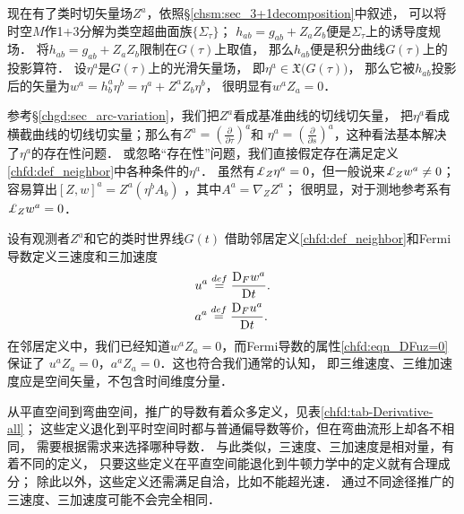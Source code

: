 现在有了类时切矢量场$Z^a$，依照\S\ref{chsm:sec_3+1decomposition}中叙述，
可以将时空$M$作1+3分解为类空超曲面族$\{\Sigma_{\tau}\}$；
$h_{ab}=g_{ab}+ Z_a Z_b$便是$\Sigma_{\tau}$上的诱导度规场．
将$h_{ab}=g_{ab}+ Z_a Z_b$限制在$G(\tau)$上取值，
那么$h_{ab}$便是积分曲线$G(\tau)$上的投影算符．
设$\eta^a$是$G(\tau)$上的光滑矢量场，
即$\eta^a \in \mathfrak{X}\bigl(G(\tau)\bigr)$，
那么它被$h_{ab}$投影后的矢量为$w^a=h^a_b \eta^b = \eta^a+Z^a Z_b \eta^b$，
很明显有$w^a Z_a=0$．


参考\S\ref{chgd:sec_arc-variation}，我们把$Z^a$看成基准曲线的切线切矢量，
把$\eta^a$看成横截曲线的切线切实量；那么有$Z^a=(\frac{\partial}{\partial \tau})^a$和
$\eta^a=(\frac{\partial}{\partial s})^a$，这种看法基本解决了$\eta^a$的存在性问题．
或忽略“存在性”问题，我们直接假定存在满足定义\ref{chfd:def_neighbor}中各种条件的$\eta^a$．
虽然有$\Lie_{Z}\eta^a =0$，但一般说来$\Lie_{Z} w^a \neq 0$；
容易算出$[Z,w]^a = Z^a (\eta^b A_b)$ ，其中$A^a=\nabla_Z Z^a$；
很明显，对于测地参考系有$\Lie_{Z} w^a =0$．







设有观测者$Z^a$和它的类时世界线$G(t)$  %
借助邻居定义\ref{chfd:def_neighbor}和Fermi导数定义三速度和三加速度
\begin{align}
    &u^a \overset{def}{=} \frac{{\rm D}_F w^a}{{\rm D} t}. \label{chfd:eqn_3v} \\
    &a^a \overset{def}{=} \frac{{\rm D}_F u^a}{{\rm D} t}. \label{chfd:eqn_3a}
\end{align}
在邻居定义中，我们已经知道$w^a Z_a=0$，而Fermi导数的属性\eqref{chfd:eqn_DFuz=0}保证了
$u^a Z_a=0$，$a^a Z_a=0$．这也符合我们通常的认知，
即三维速度、三维加速度应是空间矢量，不包含时间维度分量．

从平直空间到弯曲空间，推广的导数有着众多定义，见表\ref{chfd:tab-Derivative-all}；
这些定义退化到平时空间时都与普通偏导数等价，但在弯曲流形上却各不相同，
需要根据需求来选择哪种导数．
与此类似，三速度、三加速度是相对量，有着不同的定义，
只要这些定义在平直空间能退化到牛顿力学中的定义就有合理成分；
除此以外，这些定义还需满足自洽，比如不能超光速．
通过不同途径推广的三速度、三加速度可能不会完全相同．

